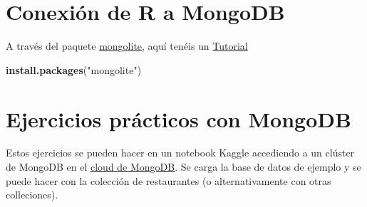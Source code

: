 \documentclass[
]{book}
\newenvironment{Shaded}{\begin{snugshade}}{\end{snugshade}}
\newcommand{\CommentTok}[1]{\textcolor[rgb]{0.56,0.35,0.01}{\textit{#1}}}
\newcommand{\DataTypeTok}[1]{\textcolor[rgb]{0.13,0.29,0.53}{#1}}
\newcommand{\KeywordTok}[1]{\textcolor[rgb]{0.13,0.29,0.53}{\textbf{#1}}}
\newcommand{\NormalTok}[1]{#1}
\newcommand{\OperatorTok}[1]{\textcolor[rgb]{0.81,0.36,0.00}{\textbf{#1}}}
\newcommand{\StringTok}[1]{\textcolor[rgb]{0.31,0.60,0.02}{#1}}
\begin{document}
\hypertarget{conexiuxf3n-de-r-a-mongodb}{%
\section{Conexión de R a MongoDB}\label{conexiuxf3n-de-r-a-mongodb}}

A través del paquete \href{https://cran.rstudio.com/web/packages/mongolite/mongolite.pdf}{mongolite}, aquí tenéis un \href{https://datascienceplus.com/using-mongodb-with-r/}{Tutorial}

\begin{Shaded}
\begin{Highlighting}[]
\KeywordTok{install.packages}\NormalTok{(}\StringTok{"mongolite"}\NormalTok{)}
\end{Highlighting}
\end{Shaded}

\begin{Shaded}
\end{Shaded}

\hypertarget{ejercicios-pruxe1cticos-con-mongodb}{%
\section{Ejercicios prácticos con MongoDB}\label{ejercicios-pruxe1cticos-con-mongodb}}

Estos ejercicios se pueden hacer en un notebook Kaggle accediendo a un clúster de MongoDB en el \href{https://cloud.mongodb.com}{cloud de MongoDB}. Se carga la base de datos de ejemplo y se puede hacer con la colección de restaurantes (o alternativamente con otras colleciones).
\end{document}

